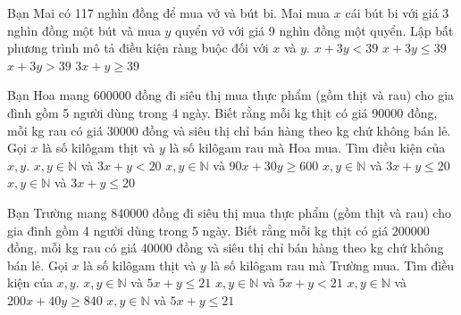 \begin{ex}
Bạn Mai có 117 nghìn đồng để mua vở và bút bi. Mai mua ${x}$ cái bút bi với giá 3 nghìn đồng một bút và mua ${y}$ quyển vở với giá 9 nghìn đồng một quyển. Lập bất phương trình mô tả điều kiện ràng buộc đối với ${x}$ và ${y}$.
\choice
{$x+3y<39$}
{\True $x+3y\le 39$}
{$x+3y>39$}
{$3x+y\ge 39$}
\end{ex}

\begin{ex}
Bạn Hoa mang 600000 đồng đi siêu thị mua thực phẩm (gồm thịt và rau) cho gia đình gồm 5 người dùng trong 4 ngày. Biết rằng mỗi kg thịt có giá 90000 đồng, mỗi kg rau có giá 30000 đồng và siêu thị chỉ bán hàng theo kg chứ không bán lẻ. Gọi ${x}$ là số kilôgam thịt và ${y}$ là số kilôgam rau mà Hoa mua. Tìm điều kiện của ${x,y}$.
\choice
{$x,y\in\mathbb{N}$ và $3x+y<20$}
{$x,y\in\mathbb{N}$ và $90x+30y\ge 600$}
{\True $x,y\in\mathbb{N}$ và $3x+y\le 20$}
{$x,y\in\mathbb{N}$ và $3x+y\le 20$}
\end{ex}

\begin{ex}
Bạn Trường mang 840000 đồng đi siêu thị mua thực phẩm (gồm thịt và rau) cho gia đình gồm 4 người dùng trong 5 ngày. Biết rằng mỗi kg thịt có giá 200000 đồng, mỗi kg rau có giá 40000 đồng và siêu thị chỉ bán hàng theo kg chứ không bán lẻ. Gọi ${x}$ là số kilôgam thịt và ${y}$ là số kilôgam rau mà Trường mua. Tìm điều kiện của ${x,y}$.
\choice
{\True $x,y\in\mathbb{N}$ và $5x+y\le 21$}
{$x,y\in\mathbb{N}$ và $5x+y<21$}
{$x,y\in\mathbb{N}$ và $200x+40y\ge 840$}
{$x,y\in\mathbb{N}$ và $5x+y\le 21$}
\end{ex}


